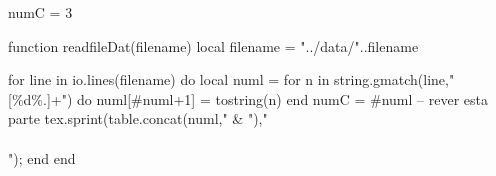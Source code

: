 

\begin{luacode}
  numC = 3

  function readfileDat(filename)
    local filename = "../data/"..filename

    for line in io.lines(filename) do
        local numl = {}
        for n in string.gmatch(line,"[\%d\%.]+") do
          numl[#numl+1] = tostring(n)
        end
        numC = #numl -- rever esta parte
        tex.sprint(table.concat(numl," & ")," \\\\");
    end
  end
\end{luacode}

\newcommand{\luaTable}[4][\directlua{tex.print(numC)}]
{
  \begin{table}[H]
  \centering
  \caption{#3}
  \begin{tabular}{*{#1}{c}}
  \hline
  #4\\
  \hline
  \directlua{readfileDat('#2')}
  \hline
  \end{tabular}
  \end{table}
}


